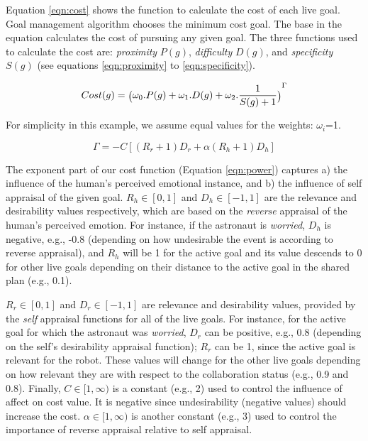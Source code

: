 \documentclass[12pt]{report}
\begin{document}
Equation \ref{eqn:cost} shows the function to calculate the cost of each live
goal. Goal management algorithm chooses the minimum cost goal. The base in the
equation calculates the cost of pursuing any given goal. The three functions
used to calculate the cost are: \textit{proximity} $P(g)$, \textit{difficulty}
$D(g)$, and \textit{specificity} $S(g)$ (see equations \ref{eqn:proximity} to
\ref{eqn:specificity}).

\begin{equation}
{\fontsize{6}{9}\selectfont Cost(g) =
\big(\omega_0.P(g)+\omega_1.D(g)+\omega_2.\frac{1}{S(g)+1}\big)}^{\Gamma}
\label{eqn:cost}
\end{equation}

\noindent For simplicity in this example, we assume equal values for the
weights:
$\omega_i$=1.

\begin{equation}
\Gamma=-C[(R_r+1)D_r + \alpha(R_h+1)D_h]
\label{eqn:power}
\end{equation}

The exponent part of our cost function (Equation \ref{eqn:power}) captures a)
the influence of the human's perceived emotional instance, and b) the influence
of self appraisal of the given goal. $R_h\in[0,1]$ and $D_h\in[-1,1]$ are the
relevance and desirability values respectively, which are based on the
\textit{reverse} appraisal of the human's perceived emotion. For instance, if
the astronaut is \textit{worried}, $D_h$ is negative, e.g., -0.8 (depending on
how undesirable the event is according to reverse appraisal), and $R_h$ will be
1 for the active goal and its value descends to 0 for other live goals depending
on their distance to the active goal in the shared plan (e.g., 0.1).

$R_r\in[0,1]$ and $D_r\in[-1,1]$ are relevance and desirability values, provided
by the \textit{self} appraisal functions for all of the live goals. For
instance, for the active goal for which the astronaut was \textit{worried},
$D_r$ can be positive, e.g., 0.8 (depending on the self's desirability appraisal
function); $R_r$ can be 1, since the active goal is relevant for the robot.
These values will change for the other live goals depending on how
relevant they are with respect to the collaboration status (e.g., 0.9 and 0.8).
Finally, $C\in[1,\infty)$ is a constant (e.g., 2) used to control the influence
of affect on cost value. It is negative since undesirability (negative values)
should increase the cost. $\alpha\in[1,\infty)$ is another constant (e.g., 3)
used to control the importance of reverse appraisal relative to self appraisal.
\end{document}
